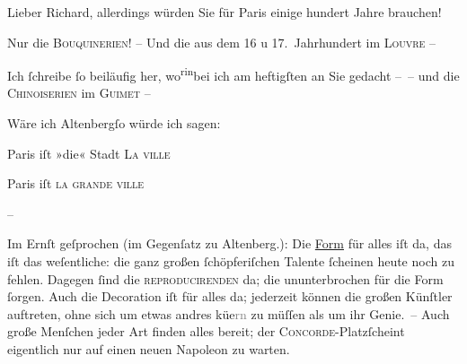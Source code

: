 \pstart{}Lieber Richard,\pend\vspace{0.5em}
\pstart
           allerdings würden Sie für Paris einige hundert
               Jahre brauchen!\pend
           
\pstart
           Nur die \textsc{Bouquinerien}! – Und die \label{K_L00670-1v}\label{K_L00670-1} aus
               dem 16 u 17. Jahrhundert im \textsc{Louvre} –\pend
           
\pstart
           Ich{ }ſchreibe{ }ſo beiläufig her, wo\substVorne{}\textsuperscript{rin}\substDazwischen{}bei\substHinten{} ich am heftigſten an Sie gedacht – {\pb}– und die
                  \textsc{Chinoiserien} im \textsc{Guimet} –\pend
           
\pstart
           Wäre ich Altenbergſo würde ich sagen:\pend
           
\pstart
           Paris iſt »die« Stadt {\dotsfive}{ }\textsc{La ville}{ }{\dotsseven}\pend
           
\pstart
           Paris iſt \textsc{la grande
                  ville}{ }{\dotsfour}\pend
           
\pstart
           \numberlinefalse{}–\numberlinetrue{}\pend
           
\pstart
           Im Ernſt geſprochen (im Gegenſatz zu Altenberg.): Die \uline{Form} für alles iſt da, \introOben{}das iſt\introOben{} das weſentliche: die ganz {\pb}großen \introOben{}ſchöpferiſchen\introOben{} Talente{ }ſcheinen heute noch zu fehlen. Dagegen{ }ſind die \textsc{reproducirenden} da; die ununterbrochen für die Form{ }ſorgen. Auch die
               Decoration iſt für alles da; jederzeit können die großen Künſtler auftreten, ohne
               sich um etwas andres kü{\geminationm}e\textcolor{gray}{rn} zu müſſen
               als um ihr Genie. – Auch große Menſchen {\pb}jeder Art
               finden alles bereit; der \textsc{Concorde}-Platzſcheint eigentlich nur auf einen neuen Napoleon zu warten.\pend
           
